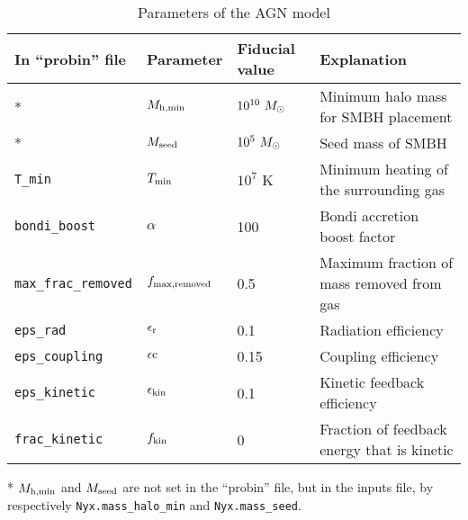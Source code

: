 \begin{table}
\begin{center}
  \caption{Parameters of the AGN model}

\begin{tabular}{l l l l}
    \toprule
In ``probin'' file & Parameter & Fiducial value & Explanation\\
    \midrule
* & $M_{\rm h, min}$ & $10^{10}~ M_\odot$ & Minimum halo mass for SMBH placement\\
* & $M_{\rm seed}$ & $10^5~ M_\odot$ & Seed mass of SMBH\\
{\tt T\_min} & $T_{\rm min}$ & $10^7$ K & Minimum heating of the surrounding gas\\
{\tt bondi\_boost} & $\alpha$ & 100 & Bondi accretion boost factor \\      
{\tt max\_frac\_removed} & $f_{\rm max, removed}$ & 0.5 & Maximum fraction of mass removed from gas \\
{\tt eps\_rad} & $\epsilon_{\rm r}$ & 0.1 & Radiation efficiency\\
{\tt eps\_coupling} & $\epsilon{\rm c}$ & 0.15 & Coupling efficiency\\
{\tt eps\_kinetic} & $\epsilon_{\rm kin}$ & 0.1 & Kinetic feedback efficiency \\
{\tt frac\_kinetic} & $f_{\rm kin}$ & 0 & Fraction of feedback energy that is kinetic \\

\bottomrule
\end{tabular}


  \label{tab:agn_params1}
 \end{center}

\medskip
* $M_{\rm h, min}$ and $M_{\rm seed}$ are not set in the ``probin''
file, but in the inputs file, by respectively
{\tt Nyx.mass\_halo\_min} and {\tt Nyx.mass\_seed}.


\end{table}


